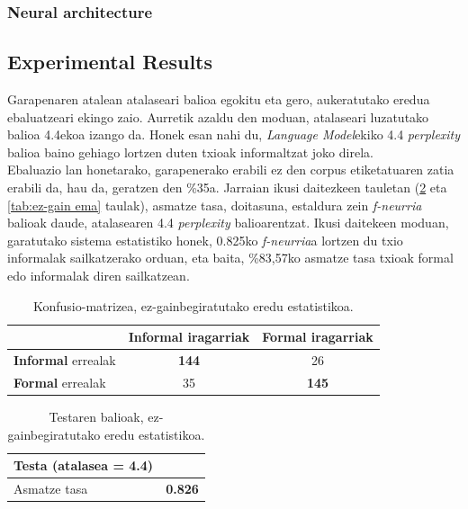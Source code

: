 \documentclass[information,article,submit,moreauthors,pdftex,10pt,a4paper]{Definitions/mdpi}
\begin{document}
\subsubsection{Neural architecture}



\subsection{Experimental Results}


\indent Garapenaren atalean atalaseari balioa egokitu eta gero, aukeratutako eredua ebaluatzeari ekingo zaio. Aurretik azaldu den moduan, atalaseari luzatutako balioa 4.4ekoa izango da. Honek esan nahi du, \textit{Language Model}ekiko 4.4 \textit{perplexity} balioa baino gehiago lortzen duten txioak informaltzat joko direla.\\
\indent Ebaluazio lan honetarako, garapenerako erabili ez den corpus etiketatuaren zatia erabili da, hau da, geratzen den \%35a. Jarraian ikusi daitezkeen tauletan (\ref{tab:Test ez-gain} eta \ref{tab:ez-gain ema} taulak), asmatze tasa, doitasuna, estaldura zein \textit{f-neurria} balioak daude, atalasearen 4.4 \textit{perplexity} balioarentzat. Ikusi daitekeen moduan, garatutako sistema estatistiko honek, 0.825ko \textit{f-neurria}a lortzen du txio informalak sailkatzerako orduan, eta baita, \%83,57ko asmatze tasa txioak formal edo informalak diren sailkatzean.

\begin{table}[H]
  \centering
  \begin{tabular}{|l|c|c|}
    \hline
    & \textbf{Informal} iragarriak & \textbf{Formal} iragarriak \\ \hline 
    \textbf{Informal} errealak & \textbf{144} & 26\\ \hline
    \textbf{Formal} errealak & 35 & \textbf{145}\\ \hline
  \end{tabular}
  \caption{Konfusio-matrizea, ez-gainbegiratutako eredu estatistikoa.}
  \label{tab:ez-gain cm}
\end{table}

\begin{table}[H]
  \centering
  \begin{tabular}{|l|r|}
    \hline
    \textbf{Testa (atalasea = 4.4)} &  \\ \hline 
    Asmatze tasa & \textbf{0.826} \\ \hline
  \end{tabular}
  \caption{Testaren balioak, ez-gainbegiratutako eredu estatistikoa.}
  \label{tab:Test ez-gain}
\end{table}
\end{document}
